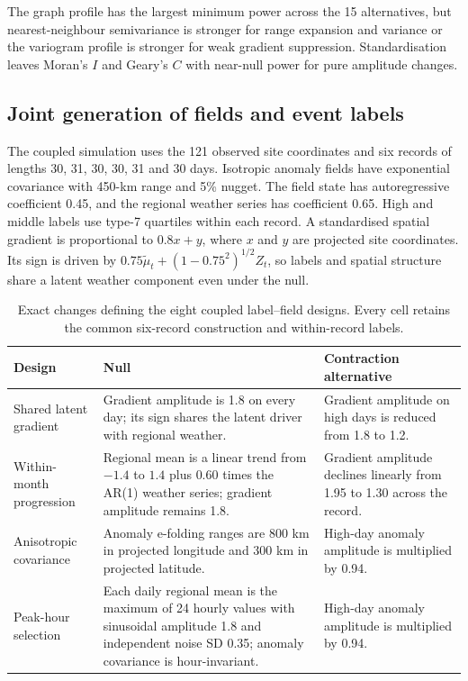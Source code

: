 \documentclass[namedate,webpdf,modern,mediumone]{oup-authoring-template}
\theoremstyle{thmstyleone}
\begin{document}
The graph profile has the largest minimum power across the
15 alternatives, but nearest-neighbour semivariance is stronger for range
expansion and variance or the variogram profile is stronger for weak gradient
suppression. Standardisation leaves Moran's $I$ and Geary's $C$ with near-null
power for pure amplitude changes.

\subsection{Joint generation of fields and event labels}

The coupled simulation uses the 121 observed site coordinates and six records
of lengths 30, 31, 30, 30, 31 and 30 days. Isotropic anomaly fields have
exponential covariance with 450-km range and 5\% nugget. The field state has
autoregressive coefficient 0.45, and the regional weather series has
coefficient 0.65. High and middle labels use type-7 quartiles within each
record. A standardised spatial gradient is proportional to $0.8x+y$, where
$x$ and $y$ are projected site coordinates. Its sign is driven by
$0.75\widetilde\mu_t+(1-0.75^2)^{1/2}Z_t$, so labels and spatial structure
share a latent weather component even under the null.

\begin{table}[htbp]
\centering
\caption{Exact changes defining the eight coupled label--field designs. Every
cell retains the common six-record construction and within-record labels.}
\label{tab:joint-dgp-specification}
\footnotesize
\setlength{\tabcolsep}{4pt}
\begin{tabularx}{\textwidth}{Z{0.22\textwidth}YY}
\toprule
Design & Null & Contraction alternative \\
\midrule
Shared latent gradient & Gradient amplitude is 1.8 on every day; its
sign shares the latent driver with regional weather. & Gradient amplitude on
high days is reduced from 1.8 to 1.2. \\

Within-month progression & Regional mean is a linear trend from $-1.4$ to
$1.4$ plus $0.60$ times the AR(1) weather series; gradient amplitude remains
1.8. & Gradient amplitude declines linearly from 1.95 to 1.30 across the
record. \\

Anisotropic covariance & Anomaly e-folding ranges are 800 km in projected
longitude and 300 km in projected latitude. & High-day anomaly amplitude is
multiplied by 0.94. \\

Peak-hour selection & Each daily regional mean is the maximum of 24 hourly
values with sinusoidal amplitude 1.8 and independent noise SD 0.35; anomaly
covariance is hour-invariant. & High-day anomaly amplitude is multiplied by
0.94. \\
\bottomrule
\end{tabularx}
\end{table}
\end{document}
